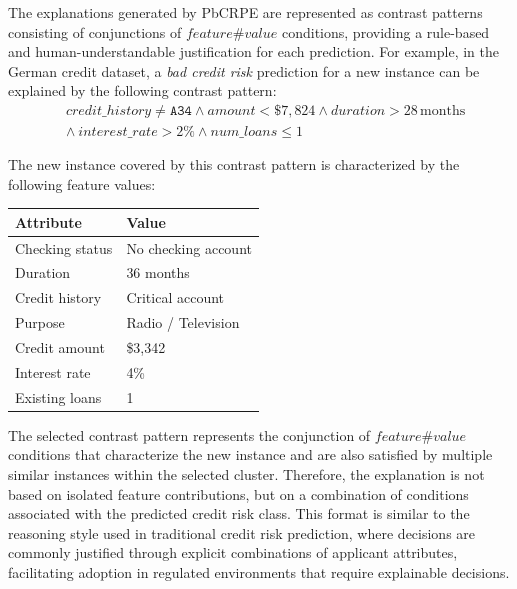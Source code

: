 {	The explanations generated by PbCRPE are represented as contrast patterns consisting of conjunctions of $feature\#value$ conditions, providing a rule-based and human-understandable justification for each prediction. For example, in the German credit dataset, a \textit{bad credit risk} prediction for a new instance can be explained by the following contrast pattern:
	\[
	\begin{aligned}
		&\mathit{credit\_history} \neq \texttt{A34} \wedge
		\mathit{amount} < \$7{,}824 \wedge
		\mathit{duration} > 28\,\mathrm{months} \\
		&\wedge\ \mathit{interest\_rate} > 2\% \wedge
		\mathit{num\_loans} \leq 1
	\end{aligned}
	\]
	
	The new instance covered by this contrast pattern is characterized by the following feature values:
	
	\begin{center}
		\small
		\label{tab:example_instance}
		\begin{tabular}{@{}ll@{}}
			\hline
			\textbf{Attribute} & \textbf{Value} \\
			\hline
			Checking status & No checking account \\
			Duration & 36 months \\
			Credit history & Critical account \\
			Purpose & Radio / Television \\
			Credit amount & \$3,342 \\
			Interest rate & 4\% \\
			Existing loans & 1 \\
			\hline
		\end{tabular}
	\end{center}
	
	The selected contrast pattern represents the conjunction of $feature\#value$ conditions that characterize the new instance and are also satisfied by multiple similar instances within the selected cluster. Therefore, the explanation is not based on isolated feature contributions, but on a combination of conditions associated with the predicted credit risk class. This format is similar to the reasoning style used in traditional credit risk prediction, where decisions are commonly justified through explicit combinations of applicant attributes, facilitating adoption in regulated
	environments that require explainable decisions.\\
	
}
